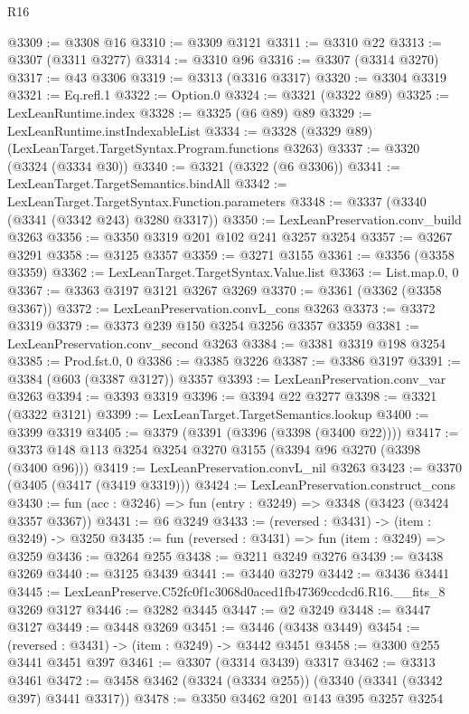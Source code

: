 \begin{lexlean}{R16}
\begin{coremodule}
@3309 := @3308 @16
@3310 := @3309 @3121
@3311 := @3310 @22
@3313 := @3307 (@3311 @3277)
@3314 := @3310 @96
@3316 := @3307 (@3314 @3270)
@3317 := @43 @3306
@3319 := @3313 (@3316 @3317)
@3320 := @3304 @3319
@3321 := Eq.refl.{1}
@3322 := Option.{0}
@3324 := @3321 (@3322 @89)
@3325 := LexLeanRuntime.index
@3328 := @3325 (@6 @89) @89
@3329 := LexLeanRuntime.instIndexableList
@3334 := @3328 (@3329 @89) (LexLeanTarget.TargetSyntax.Program.functions @3263)
@3337 := @3320 (@3324 (@3334 @30))
@3340 := @3321 (@3322 (@6 @3306))
@3341 := LexLeanTarget.TargetSemantics.bindAll
@3342 := LexLeanTarget.TargetSyntax.Function.parameters
@3348 := @3337 (@3340 (@3341 (@3342 @243) @3280 @3317))
@3350 := LexLeanPreservation.conv_build @3263
@3356 := @3350 @3319 @201 @102 @241 @3257 @3254
@3357 := @3267 @3291
@3358 := @3125 @3357
@3359 := @3271 @3155
@3361 := @3356 (@3358 @3359)
@3362 := LexLeanTarget.TargetSyntax.Value.list
@3363 := List.map.{0, 0}
@3367 := @3363 @3197 @3121 @3267 @3269
@3370 := @3361 (@3362 (@3358 @3367))
@3372 := LexLeanPreservation.convL_cons @3263
@3373 := @3372 @3319
@3379 := @3373 @239 @150 @3254 @3256 @3357 @3359
@3381 := LexLeanPreservation.conv_second @3263
@3384 := @3381 @3319 @198 @3254
@3385 := Prod.fst.{0, 0}
@3386 := @3385 @3226
@3387 := @3386 @3197
@3391 := @3384 (@603 (@3387 @3127)) @3357
@3393 := LexLeanPreservation.conv_var @3263
@3394 := @3393 @3319
@3396 := @3394 @22 @3277
@3398 := @3321 (@3322 @3121)
@3399 := LexLeanTarget.TargetSemantics.lookup
@3400 := @3399 @3319
@3405 := @3379 (@3391 (@3396 (@3398 (@3400 @22))))
@3417 := @3373 @148 @113 @3254 @3254 @3270 @3155 (@3394 @96 @3270 (@3398 (@3400 @96)))
@3419 := LexLeanPreservation.convL_nil @3263
@3423 := @3370 (@3405 (@3417 (@3419 @3319)))
@3424 := LexLeanPreservation.construct_cons
@3430 := fun (acc : @3246) => fun (entry : @3249) => @3348 (@3423 (@3424 @3357 @3367))
@3431 := @6 @3249
@3433 := (reversed : @3431) -> (item : @3249) -> @3250
@3435 := fun (reversed : @3431) => fun (item : @3249) => @3259
@3436 := @3264 @255
@3438 := @3211 @3249 @3276
@3439 := @3438 @3269
@3440 := @3125 @3439
@3441 := @3440 @3279
@3442 := @3436 @3441
@3445 := LexLeanPreserve.C52fc0f1c3068d0aced1fb47369ccdcd6.R16.__fits_8 @3269 @3127
@3446 := @3282 @3445
@3447 := @2 @3249
@3448 := @3447 @3127
@3449 := @3448 @3269
@3451 := @3446 (@3438 @3449)
@3454 := (reversed : @3431) -> (item : @3249) -> @3442 @3451
@3458 := @3300 @255 @3441 @3451 @397
@3461 := @3307 (@3314 @3439) @3317
@3462 := @3313 @3461
@3472 := @3458 @3462 (@3324 (@3334 @255)) (@3340 (@3341 (@3342 @397) @3441 @3317))
@3478 := @3350 @3462 @201 @143 @395 @3257 @3254

\end{coremodule}
\end{lexlean}

